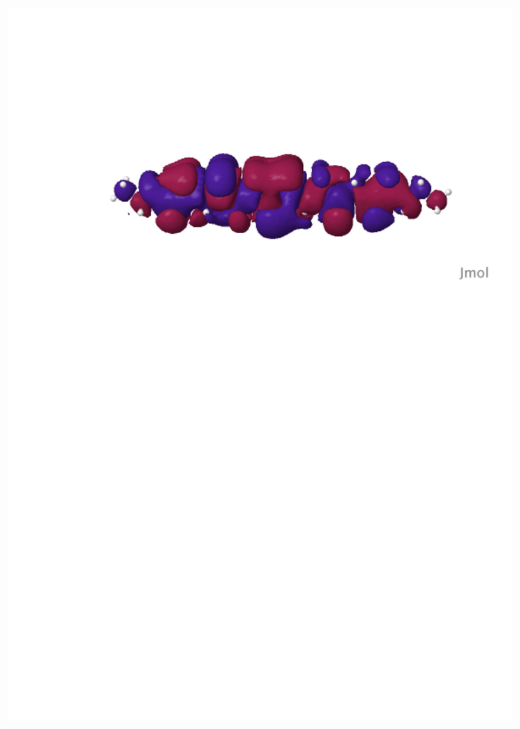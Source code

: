 \documentclass[mathserif, 10pt]{beamer}
\begin{document}
\begin{frame}
\begin{columns}
\begin{column}[b]{0.48\linewidth}
    \includegraphics[scale=0.25, clip, viewport = 80 560 600 700]{figures/can_orb_1.pdf}\\

\end{column}
\end{columns}
\end{frame}
\end{document}
